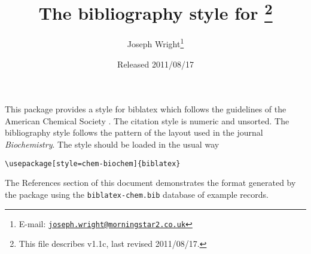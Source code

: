 \documentclass[a4paper]{ltxdoc}
\author{Joseph Wright\thanks{E-mail: 
  \href{mailto:joseph.wright@morningstar2.co.uk}
  {\texttt{joseph.wright@morningstar2.co.uk}}}}
\title{The \pkg{chem-biochem} bibliography style for \pkg{biblatex}%
  \footnote{This file describes v1.1c, last revised 2011/08/17.}}
\date{Released 2011/08/17}
\providecommand*\pkg[1]{\textsf{#1}}
\begin{document}
\maketitle

This package provides a style for \pkg{biblatex} which follows the
guidelines of the American Chemical Society \autocite{Coghill2006}.
The citation style is numeric
and unsorted. The bibliography style follows the pattern of the layout
used in the journal \emph{Biochemistry}. The
style should be loaded in the usual way
\begin{verbatim}
\usepackage[style=chem-biochem]{biblatex}
\end{verbatim}
The References section of this document demonstrates the format 
generated by the package using the \texttt{biblatex-chem.bib} database
of example records.

\nocite{*}

\printbibliography
\end{document}
